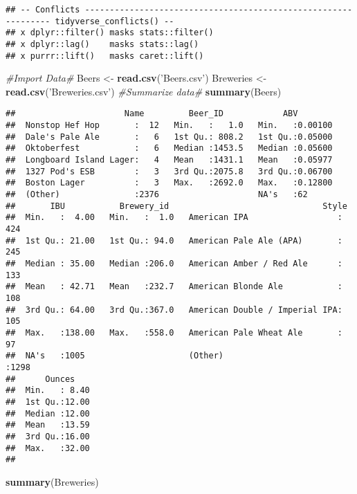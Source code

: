 \documentclass[]{article}
\newenvironment{Shaded}{\begin{snugshade}}{\end{snugshade}}
\newcommand{\CommentTok}[1]{\textcolor[rgb]{0.56,0.35,0.01}{\textit{#1}}}
\newcommand{\KeywordTok}[1]{\textcolor[rgb]{0.13,0.29,0.53}{\textbf{#1}}}
\newcommand{\NormalTok}[1]{#1}
\newcommand{\StringTok}[1]{\textcolor[rgb]{0.31,0.60,0.02}{#1}}
\begin{document}
\begin{verbatim}
## -- Conflicts --------------------------------------------------------------- tidyverse_conflicts() --
## x dplyr::filter() masks stats::filter()
## x dplyr::lag()    masks stats::lag()
## x purrr::lift()   masks caret::lift()
\end{verbatim}

\begin{Shaded}
\begin{Highlighting}[]
\CommentTok{#Import Data#}
\NormalTok{Beers <-}\StringTok{ }\KeywordTok{read.csv}\NormalTok{(}\StringTok{'Beers.csv'}\NormalTok{)}
\NormalTok{Breweries <-}\StringTok{ }\KeywordTok{read.csv}\NormalTok{(}\StringTok{'Breweries.csv'}\NormalTok{)}
\CommentTok{#Summarize data#}
\KeywordTok{summary}\NormalTok{(Beers)}
\end{Highlighting}
\end{Shaded}

\begin{verbatim}
##                      Name         Beer_ID            ABV         
##  Nonstop Hef Hop       :  12   Min.   :   1.0   Min.   :0.00100  
##  Dale's Pale Ale       :   6   1st Qu.: 808.2   1st Qu.:0.05000  
##  Oktoberfest           :   6   Median :1453.5   Median :0.05600  
##  Longboard Island Lager:   4   Mean   :1431.1   Mean   :0.05977  
##  1327 Pod's ESB        :   3   3rd Qu.:2075.8   3rd Qu.:0.06700  
##  Boston Lager          :   3   Max.   :2692.0   Max.   :0.12800  
##  (Other)               :2376                    NA's   :62       
##       IBU           Brewery_id                               Style     
##  Min.   :  4.00   Min.   :  1.0   American IPA                  : 424  
##  1st Qu.: 21.00   1st Qu.: 94.0   American Pale Ale (APA)       : 245  
##  Median : 35.00   Median :206.0   American Amber / Red Ale      : 133  
##  Mean   : 42.71   Mean   :232.7   American Blonde Ale           : 108  
##  3rd Qu.: 64.00   3rd Qu.:367.0   American Double / Imperial IPA: 105  
##  Max.   :138.00   Max.   :558.0   American Pale Wheat Ale       :  97  
##  NA's   :1005                     (Other)                       :1298  
##      Ounces     
##  Min.   : 8.40  
##  1st Qu.:12.00  
##  Median :12.00  
##  Mean   :13.59  
##  3rd Qu.:16.00  
##  Max.   :32.00  
## 
\end{verbatim}

\begin{Shaded}
\begin{Highlighting}[]
\KeywordTok{summary}\NormalTok{(Breweries)}
\end{Highlighting}
\end{Shaded}
\end{document}
